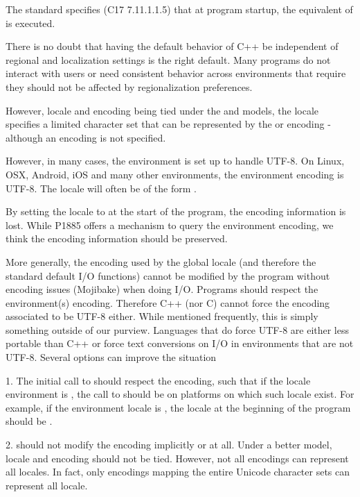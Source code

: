 \documentclass{wg21}
\begin{document}
The \cite{C} standard specifies (C17 7.11.1.1.5) that
at program startup, the equivalent of  is executed.

There is no doubt that having the default behavior of C++ be independent of regional and localization settings is the right default.
Many programs do not interact with users or need consistent behavior across environments that require they should not be affected by regionalization preferences.

However, locale and encoding being tied under the  and  models,
the  locale specifies a limited character set that can be represented by the  or  encoding - although an encoding is not specified.

However, in many cases, the environment is set up to handle UTF-8.
On Linux, OSX, Android, iOS and many other environments, the environment encoding is UTF-8. The locale will often be of the form .

By setting the locale to  at the start of the program, the encoding information is lost.
While P1885 \cite{P1885R0} offers a mechanism to query the environment encoding, we think the encoding information should be preserved.

More generally, the encoding used by the global locale (and therefore the standard default I/O functions) cannot be modified by the program without encoding issues (Mojibake) when doing I/O.
Programs should respect the environment(s) encoding.
Therefore C++ (nor C) cannot force the encoding associated to be UTF-8 either. 
While mentioned frequently, this is simply something outside of our purview.
Languages that do force UTF-8 are either less portable than C++ or force text conversions on I/O in environments that are not UTF-8.
Several options can improve the situation

1.  The initial call to  should respect the encoding, such that if the locale environment is , the call to  should be  on platforms on which such locale exist.
For example, if the environment locale is , the locale at the beginning of the program should be .

2.  should not modify the encoding implicitly or at all. Under a better model, locale and encoding should not be tied.
However, not all encodings can represent all locales.
In fact, only encodings mapping the entire Unicode character sets can represent all locale.
\end{document}

